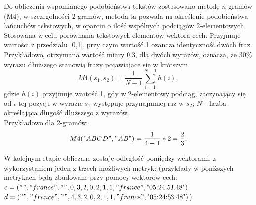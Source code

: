 \documentclass{classrep}
\begin{document}
Do obliczenia wspomianego podobieństwa tekstów zostosowano metodę \(n\)-gramów (M4), w szczególności \(2\)-gramów, metoda ta pozwala na określenie podobieństwa łańcuchów tekstowych, w oparciu o ilość wspólnych podciągów \(2\)-elementowych. Stosowana w celu porównania tekstowych elementów wektora cech. 
Przyjmuje wartości z przedziału [0,1], przy czym wartość 1 ozancza identyczność dwóch fraz. Przykładowo, otrzymana wartość miary 0.3, dla dwóch wyrazów, oznacza, że 30\% wyrazu dłuższego stanowią frazy pojawiające się w krótszym. 
    \begin{equation}
      M4(s_1, s_2) = \frac{1}{N-1} \sum_{i=1}^{N-1} h(i),
    \end{equation}
  gdzie \(h(i)\) przyjmuje wartość 1, gdy w \(2\)-elementowy podciąg, zaczynający się od \(i\)-tej pozycji w wyrazie \(s_1\) występuje przynajmniej raz w \(s_2\);
  \(N\) - liczba określająca długość dłuższego z wyrazów.\\ Przykładowo dla 2-gramów:
\begin{equation}
      M4("ABCD", "AB") = \frac{1}{4-1} * 2 = \frac{2}{3},
\end{equation}



W kolejnym etapie obliczane zostaje odległość pomiędzy wektorami, z wykorzystaniem
jeden z trzech możliwych metryk: 
(przykłady w poniższych metrykach będą zbudowane przy pomocy wektorów cech: \\
 $c = ("", "france", "", 0, 3, 2, 0, 2, 1, 1, "france", \text{"05:24:53.48"})$ \\
 $d = ("", "france", "", 4, 3, 2, 0, 2, 1, 1, "france", \text{"05:24:53.48"})$)
\end{document}
